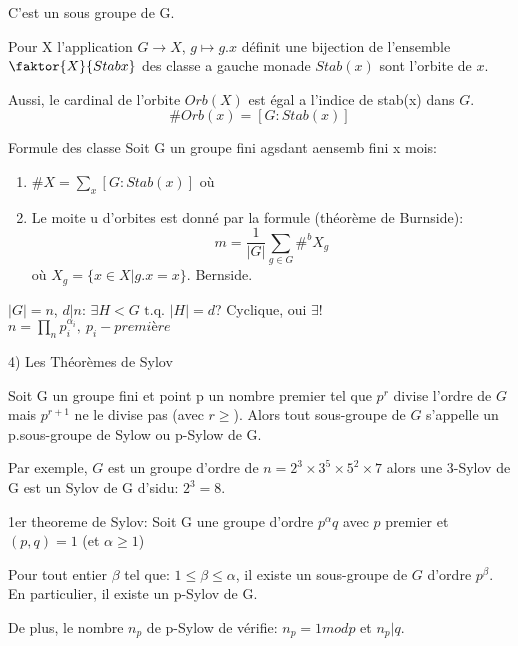 \begin{proposition}
	C'est un sous groupe de G. %
\end{proposition}

\begin{proposition} 
	Pour X l'application $G\rightarrow X$, $g\mapsto g.x$ définit une bijection de l'ensemble $\faktor{X}{Stab{x}}$ des classe a gauche monade $Stab(x)$ sont l'orbite de $x$.
\end{proposition}

Aussi, le cardinal de l'orbite $Orb(X)$ est égal a l'indice de stab(x) dans $G$.
$$\#Orb(x) =[G: Stab(x)]$$

\begin{theorem}{Formule des classe}
	Soit G un groupe fini agsdant aensemb fini x mois:
	\begin{enumerate}
		\item $\#X=\sum\limits_x[G: Stab(x)]$ où 
		\item Le moite u d'orbites est donné par la formule (théorème de Burnside):
		$$m=\frac{1}{|G|}\sum\limits_{g\in G}\#^bX_g$$
		où $X_g=\{x\in X | g.x=x\}$. Bernside.
	\end{enumerate}
\end{theorem}

\begin{remark}
	$|G|=n$, $d | n$: $\exists H<G \text{ t.q. } |H|=d$? Cyclique, oui $\exists !$\\
	$n=\prod\limits_n p_i^{\alpha_i},\ p_i - première$
\end{remark}

4) Les Théorèmes de Sylov

Soit G un groupe fini et point p un nombre premier tel que $p^r$ divise l'ordre de $G$ mais $p^{r+1}$ ne le divise pas (avec $r\geq$).
Alors tout sous-groupe de $G$ s'appelle un p.sous-groupe de Sylow ou p-Sylow de G.

Par exemple, $G$ est un groupe d'ordre de $n=2^3\times 3^5\times 5^2 \times 7$
alors une 3-Sylov de G est un Sylov de G d'sidu: $2^3=8$.

1er theoreme de Sylov: Soit G une groupe d'ordre $p^\alpha q$ avec $p$ premier et $(p, q)= 1$ (et $\alpha \geq 1$)

Pour tout entier $\beta$ tel que: $1\leq \beta \leq \alpha$, il existe un sous-groupe de $G$ d'ordre $p^\beta$. En particulier, il existe un p-Sylov de G.

De plus, le nombre $n_p$ de p-Sylow de vérifie:
$n_p = 1 mod p$ et $n_p | q$.

